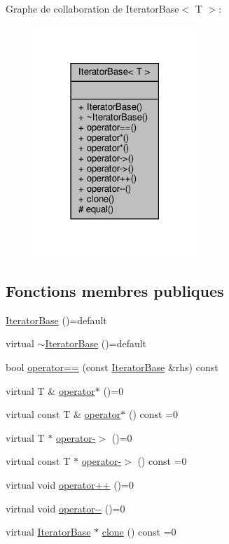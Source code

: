 Graphe de collaboration de Iterator\+Base$<$ T $>$\+:\nopagebreak
\begin{figure}[H]
\begin{center}
\leavevmode
\includegraphics[width=174pt]{class_iterator_base__coll__graph}
\end{center}
\end{figure}
\subsection*{Fonctions membres publiques}
\begin{DoxyCompactItemize}
\item 
\hyperlink{class_iterator_base_a6d1810e7a0a84574bb61d78bb99d96bb}{Iterator\+Base} ()=default
\item 
virtual \hyperlink{class_iterator_base_a9b0e1d44c1fb3e68171746b045676526}{$\sim$\+Iterator\+Base} ()=default
\item 
bool \hyperlink{class_iterator_base_a7475728422cb73f91d1c4cb4c3d07499}{operator==} (const \hyperlink{class_iterator_base}{Iterator\+Base} \&rhs) const
\item 
virtual T \& \hyperlink{class_iterator_base_a532583e58bce168648bdbdedb3a7d5ab}{operator$\ast$} ()=0
\item 
virtual const T \& \hyperlink{class_iterator_base_abc219468b68f2b5471494d04d00f6ec7}{operator$\ast$} () const =0
\item 
virtual T $\ast$ \hyperlink{class_iterator_base_aad2254f7877e4647f699ceb455e893ff}{operator-\/$>$} ()=0
\item 
virtual const T $\ast$ \hyperlink{class_iterator_base_a49d96fd63062ca0d7fd813517ad69f03}{operator-\/$>$} () const =0
\item 
virtual void \hyperlink{class_iterator_base_a816f35e9020716d212124a34f1c033fb}{operator++} ()=0
\item 
virtual void \hyperlink{class_iterator_base_aa9bf0f75a8bb7e4d416a9b88ccacd9c7}{operator-\/-\/} ()=0
\item 
virtual \hyperlink{class_iterator_base}{Iterator\+Base} $\ast$ \hyperlink{class_iterator_base_a541fdf8cc48f31c8ddfdc3f319a37100}{clone} () const =0
\end{DoxyCompactItemize}
